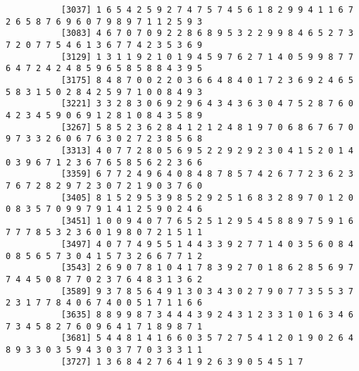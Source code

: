 \documentclass{article}
\begin{document}
\begin{itemize}
\begin{scriptsize}
\begin{verbatim}
		   [3037] 1 6 5 4 2 5 9 2 7 4 7 5 7 4 5 6 1 8 2 9 9 4 1 1 6 7 2 6 5 8 7 6 9 6 0 7 9 8 9 7 1 1 2 5 9 3
		   [3083] 4 6 7 0 7 0 9 2 2 8 6 8 9 5 3 2 2 9 9 8 4 6 5 2 7 3 7 2 0 7 7 5 4 6 1 3 6 7 7 4 2 3 5 3 6 9
		   [3129] 1 3 1 1 9 2 1 0 1 9 4 5 9 7 6 2 7 1 4 0 5 9 9 8 7 7 6 4 7 2 4 2 4 8 5 9 6 5 8 5 8 8 4 3 9 5
		   [3175] 8 4 8 7 0 0 2 2 0 3 6 6 4 8 4 0 1 7 2 3 6 9 2 4 6 5 5 8 3 1 5 0 2 8 4 2 5 9 7 1 0 0 8 4 9 3
		   [3221] 3 3 2 8 3 0 6 9 2 9 6 4 3 4 3 6 3 0 4 7 5 2 8 7 6 0 4 2 3 4 5 9 0 6 9 1 2 8 1 0 8 4 3 5 8 9
		   [3267] 5 8 5 2 3 6 2 8 4 1 2 1 2 4 8 1 9 7 0 6 8 6 7 6 7 0 9 7 3 3 2 6 0 6 7 6 3 0 2 7 2 3 8 5 6 8
		   [3313] 4 0 7 7 2 8 0 5 6 9 5 2 2 9 2 9 2 3 0 4 1 5 2 0 1 4 0 3 9 6 7 1 2 3 6 7 6 5 8 5 6 2 2 3 6 6
		   [3359] 6 7 7 2 4 9 6 4 0 8 4 8 7 8 5 7 4 2 6 7 7 2 3 6 2 3 7 6 7 2 8 2 9 7 2 3 0 7 2 1 9 0 3 7 6 0
		   [3405] 8 1 5 2 9 5 3 9 8 5 2 9 2 5 1 6 8 3 2 8 9 7 0 1 2 0 0 8 3 5 7 0 9 9 7 9 1 4 1 2 5 9 0 2 4 6
		   [3451] 1 0 0 9 4 0 7 7 6 5 2 5 1 2 9 5 4 5 8 8 9 7 5 9 1 6 7 7 7 8 5 3 2 3 6 0 1 9 8 0 7 2 1 5 1 1
		   [3497] 4 0 7 7 4 9 5 5 1 4 4 3 3 9 2 7 7 1 4 0 3 5 6 0 8 4 0 8 5 6 5 7 3 0 4 1 5 7 3 2 6 6 7 7 1 2
		   [3543] 2 6 9 0 7 8 1 0 4 1 7 8 3 9 2 7 0 1 8 6 2 8 5 6 9 7 7 4 4 5 0 8 7 7 0 2 3 7 6 4 8 3 1 3 6 2
		   [3589] 9 3 7 8 5 6 4 9 1 3 0 3 4 3 0 2 7 9 0 7 7 3 5 5 3 7 2 3 1 7 7 8 4 0 6 7 4 0 0 5 1 7 1 1 6 6
		   [3635] 8 8 9 9 8 7 3 4 4 4 3 9 2 4 3 1 2 3 3 1 0 1 6 3 4 6 7 3 4 5 8 2 7 6 0 9 6 4 1 7 1 8 9 8 7 1
		   [3681] 5 4 4 8 1 4 1 6 6 0 3 5 7 2 7 5 4 1 2 0 1 9 0 2 6 4 8 9 3 3 0 3 5 9 4 3 0 3 7 7 0 3 3 3 1 1
		   [3727] 1 3 6 8 4 2 7 6 4 1 9 2 6 3 9 0 5 4 5 1 7
	

\end{verbatim}
\end{scriptsize}
\end{itemize}
\end{document}
